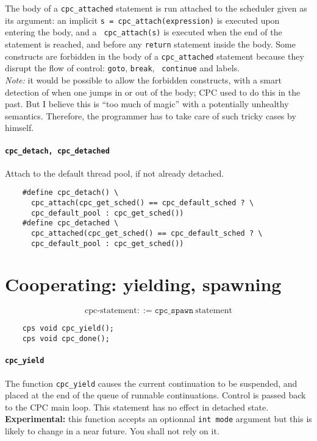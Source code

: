 \documentclass[a4paper]{report}
\begin{document}
The body of a {\tt cpc\_attached} statement is run attached to the
scheduler given as its argument: an implicit {\tt s =
cpc\_attach(expression)} is executed upon entering the body, and a {\tt
cpc\_attach(s)} is executed when the end of the statement is reached,
and before any {\tt return} statement inside the body.  Some constructs
are forbidden in the body of a {\tt cpc\_attached} statement because
they disrupt the flow of control: {\tt goto}, {\tt break}, {\tt
continue} and labels.\\
{\em Note:\/} it would be possible to allow the forbidden constructs,
with a smart detection of when one jumps in or out of the body; CPC used
to do this in the past.  But I believe this is ``too much of magic''
with a potentially unhealthy semantics.  Therefore, the programmer has
to take care of such tricky cases by himself.

\paragraph{\tt cpc\_detach, cpc\_detached} Attach to the default thread
pool, if not already detached.
\begin{verbatim}
    #define cpc_detach() \
      cpc_attach(cpc_get_sched() == cpc_default_sched ? \
      cpc_default_pool : cpc_get_sched())
    #define cpc_detached \
      cpc_attached(cpc_get_sched() == cpc_default_sched ? \
      cpc_default_pool : cpc_get_sched())
\end{verbatim}
\section{Cooperating: yielding, spawning} \label{sec:cooperating}

\[ \mbox{cpc-statement} ::=
   \mathtt{cpc\_spawn}\ \mbox{statement} \]
\begin{verbatim}
    cps void cpc_yield();
    cps void cpc_done();
\end{verbatim}

\paragraph{\tt cpc\_yield} The function {\tt cpc\_yield} causes the
current continuation to be suspended, and placed at the end of the
queue of runnable continuations.  Control is passed back to the CPC
main loop.  This statement has no effect in detached state.\\
{\bf Experimental:} this function accepts an optionnal {\tt int mode}
argument but this is likely to change in a near future.  You shall not
rely on it.
\end{document}
